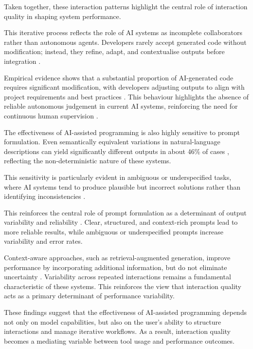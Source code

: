 \documentclass[conference]{IEEEtran}
\begin{document}
Taken together, these interaction patterns highlight the central role of interaction quality in shaping system performance.

This iterative process reflects the role of AI systems as incomplete collaborators rather than autonomous agents. Developers rarely accept generated code without modification; instead, they refine, adapt, and contextualise outputs before integration \cite{pinto_developer_2024}.

Empirical evidence shows that a substantial proportion of AI-generated code requires significant modification, with developers adjusting outputs to align with project requirements and best practices \cite{borg_echoes_2026}. This behaviour highlights the absence of reliable autonomous judgement in current AI systems, reinforcing the need for continuous human supervision \cite{bento_leveraging_2025}.

The effectiveness of AI-assisted programming is also highly sensitive to prompt formulation. Even semantically equivalent variations in natural-language descriptions can yield significantly different outputs in about 46\% of cases \cite{mastropaolo_robustness_2023}, reflecting the non-deterministic nature of these systems.

This sensitivity is particularly evident in ambiguous or underspecified tasks, where AI systems tend to produce plausible but incorrect solutions rather than identifying inconsistencies \cite{larbi_when_2025}.

This reinforces the central role of prompt formulation as a determinant of output variability and reliability \cite{zhong_developer-llm_2025}. Clear, structured, and context-rich prompts lead to more reliable results, while ambiguous or underspecified prompts increase variability and error rates.

Context-aware approaches, such as retrieval-augmented generation, improve performance by incorporating additional information, but do not eliminate uncertainty \cite{pinto_developer_2024}. Variability across repeated interactions remains a fundamental characteristic of these systems. This reinforces the view that interaction quality acts as a primary determinant of performance variability.

These findings suggest that the effectiveness of AI-assisted programming depends not only on model capabilities, but also on the user's ability to structure interactions and manage iterative workflows. As a result, interaction quality becomes a mediating variable between tool usage and performance outcomes.
\end{document}

